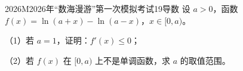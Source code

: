
\begin{problem}{2026}{M}{2026年“数海漫游”第一次模拟考试}{19}{导数}
设 $a>0$，函数 $f(x)=\ln(a+x)-\ln(a-x)$，$x\in[0,a)$。

（1）若 $a=1$，证明：$f'(x)\leq0$；

（2）若 $f(x)$ 在 $[0,a)$ 上不是单调函数，求 $a$ 的取值范围。
\end{problem}